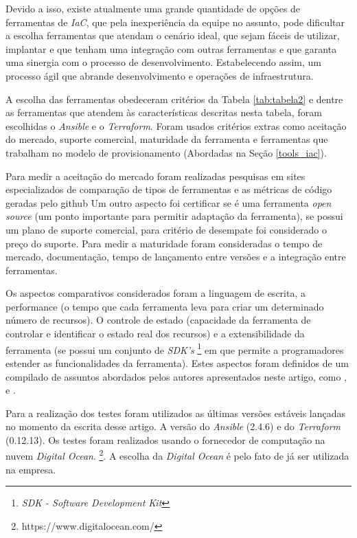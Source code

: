 Devido a isso, existe atualmente uma grande quantidade de opções de ferramentas de \textit{IaC}, que pela inexperiência da equipe no assunto, pode dificultar a escolha ferramentas que atendam o cenário ideal, que sejam fáceis de utilizar, implantar e que tenham uma integração com outras ferramentas e que garanta uma sinergia com o processo de desenvolvimento. Estabelecendo assim, um processo ágil que abrande desenvolvimento e operações de infraestrutura.  

A escolha das ferramentas obedeceram critérios da Tabela \ref{tab:tabela2} e dentre as ferramentas que atendem às características descritas nesta tabela, foram escolhidas o \textit{Ansible} e o \textit{Terraform}. Foram usados critérios extras como aceitação do mercado, suporte comercial, maturidade da ferramenta e ferramentas que trabalham no modelo de provisionamento (Abordadas na Seção \ref{tools_iac}).

Para medir a aceitação do mercado foram realizadas pesquisas em sites especializados de comparação de tipos de ferramentas e as métricas de código geradas pelo github Um outro aspecto foi certificar se é uma ferramenta \textit{open source} (um ponto importante para permitir adaptação da ferramenta), se possui um plano de suporte comercial, para critério de desempate foi considerado o preço do suporte. Para medir a maturidade foram consideradas o tempo de mercado, documentação, tempo de lançamento entre versões e a integração entre ferramentas.

Os aspectos comparativos considerados foram a linguagem de escrita, a performance (o tempo que cada ferramenta leva para criar um determinado número de recursos). O controle de estado (capacidade da ferramenta  de controlar e identificar o estado real dos recursos) e a extensibilidade da ferramenta (se possui um conjunto de \textit{SDK's} \footnote{\textit{SDK - Software Development Kit}} em que permite a programadores estender as funcionalidades da ferramenta).  Estes aspectos foram definidos de um compilado de assuntos abordados pelos autores apresentados neste artigo, como \cite{steve}, \cite{masek} e \cite{Morris:2016:ICM:3006361}.

Para a realização dos testes foram utilizados as últimas versões estáveis lançadas no momento da escrita desse artigo. A versão do \textit{Ansible} (2.4.6) e do \textit{Terraform} (0.12.13). Os testes foram realizados usando o fornecedor de computação na nuvem \textit{Digital Ocean}. \footnote{https://www.digitalocean.com/}. A escolha da \textit{Digital Ocean} é pelo fato de já ser utilizada na empresa. 


